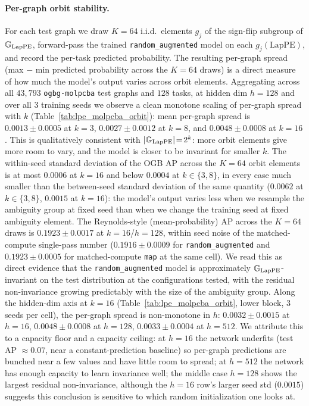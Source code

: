 \paragraph{Per-graph orbit stability.}
For each test graph we draw $K\!=\!64$ i.i.d.\ elements $g_j$ of the
sign-flip subgroup of $\mathbb{G}_{\mathrm{LapPE}}$, forward-pass the trained
\texttt{random\_augmented} model on each $g_j(\mathrm{LapPE})$, and
record the per-task predicted probability. The resulting per-graph
spread (max $-$ min predicted probability across the $K\!=\!64$ draws)
is a direct measure of how much the model's output varies across
orbit elements. Aggregating across all $43{,}793$ \texttt{ogbg-molpcba}
test graphs and $128$ tasks, at hidden dim $h\!=\!128$ and over all
$3$ training seeds we observe a clean monotone scaling of per-graph
spread with $k$ (Table~\ref{tab:lpe_molpcba_orbit}): mean per-graph
spread is $0.0013\!\pm\!0.0005$ at $k\!=\!3$, $0.0027\!\pm\!0.0012$
at $k\!=\!8$, and $0.0048\!\pm\!0.0008$ at $k\!=\!16$. This is
qualitatively consistent with $|\mathbb{G}_{\mathrm{LapPE}}|\!=\!2^{k}$:
more orbit elements give more room to vary, and the model is closer
to be invariant for smaller $k$. The within-seed standard deviation of
the OGB AP across the $K\!=\!64$ orbit elements is at most $0.0006$
at $k\!=\!16$ and below $0.0004$ at $k\!\in\!\{3,8\}$, in every case
much smaller than the between-seed standard deviation of the same
quantity ($0.0062$ at $k\!\in\!\{3,8\}$, $0.0015$ at $k\!=\!16$):
the model's output varies less when we resample the ambiguity group
at fixed seed than when we change the training seed at fixed
ambiguity element. The Reynolds-style (mean-probability) AP across
the $K\!=\!64$ draws is $0.1923\!\pm\!0.0017$ at
$k\!=\!16$/$h\!=\!128$, within seed noise of the matched-compute
single-pass number ($0.1916\!\pm\!0.0009$ for
\texttt{random\_augmented} and $0.1923\!\pm\!0.0005$ for
matched-compute \texttt{map} at the same cell). We read this as
direct evidence that the \texttt{random\_augmented} model is
approximately $\mathbb{G}_{\mathrm{LapPE}}$-invariant on the test
distribution at the configurations tested, with the residual
non-invariance growing predictably with the size of the ambiguity
group. Along the hidden-dim axis at $k\!=\!16$
(Table~\ref{tab:lpe_molpcba_orbit}, lower block, $3$ seeds per cell),
the per-graph spread is non-monotone in $h$:
$0.0032\!\pm\!0.0015$ at $h\!=\!16$,
$0.0048\!\pm\!0.0008$ at $h\!=\!128$,
$0.0033\!\pm\!0.0004$ at $h\!=\!512$. We attribute this to a
capacity floor and a capacity ceiling: at $h\!=\!16$ the network
underfits (test AP $\approx\!0.07$, near a constant-prediction
baseline) so per-graph predictions are bunched near a few values
and have little room to spread; at $h\!=\!512$ the network has
enough capacity to learn invariance well; the middle case
$h\!=\!128$ shows the largest residual non-invariance, although the
$h\!=\!16$ row's larger seed std ($0.0015$) suggests this conclusion
is sensitive to which random initialization one looks at.


